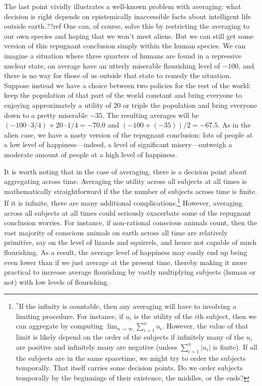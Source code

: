 The last point vividly illustrates a well-known problem with averaging: what decision is right depends on epistemically
inaccessible facts about intelligent life outside earth.??ref One can, of course, solve this by restricting the averaging
to our own species and hoping that we won't meet aliens. But we can still get
some version of this repugnant conclusion simply within the human species. We can imagine a situation where three quarters of humans 
are found in a repressive nuclear state, on average have an utterly miserable flourishing level of $-100$, and there is no way for those of us outside
that state to remedy the situation. Suppose instead we have a choice between two policies for the rest of the world: keep the 
population of that part of the world constant and bring everyone to enjoying approximately a utility of $20$ or triple the population 
and bring  everyone down to a pretty miserable $-35$. The resulting averages will be $(-100\cdot 3/4)+20\cdot 1/4 = -70.0$ and $(-100+(-35))/2 = -67.5$.
As in the alien case, we have a nasty version of the repugnant conclusion: lots of people at a low level of happiness---indeed, a level 
of significant misery---outweigh a moderate amount of people at a high level of happiness. 

It is worth noting that in the case of averaging, there is a decision point about aggregating across time. Averaging the utility 
across all subjects at all times is mathematically straightforward if the the number of subjects across time is finite. If it is infinite,
there are many additional complications.\footnote{$^*$If the infinity is countable, then any averaging will have to 
involving a limiting procedure. For instance, if $u_i$ is the utility of the $i$th subject, then we can aggregate by computing
$\lim_{n\to\infty} \sum_{i=1}^n u_i$. However, the value of that limit is likely depend on the order of the subjects if
infinitely many of the $u_i$ are positive and infinitely many are negative (unless $\sum_{i=1}^n |u_i|$ is finite).
If all the subjects are in the same spacetime, we might try to order the subjects temporally. That itself carries some decision
points. Do we order subjects temporally by the beginnings of their existence, the middles, or the ends?} However, averaging across all
subjects at all times could seriously exacerbate some of the repugnant conclusion worries. For instance, if non-rational 
conscious animals count, then the vast majority of conscious animals on earth across all time are relatively primitive,
say on the level of lizards and squirrels, and hence not capable of much flourishing. As a result, the average level of happiness
may easily end up being even lower than if we just average at the present time, thereby making it more practical to increase 
average flourishing by vastly multiplying subjects (human or not) with low levels of flourishing.

